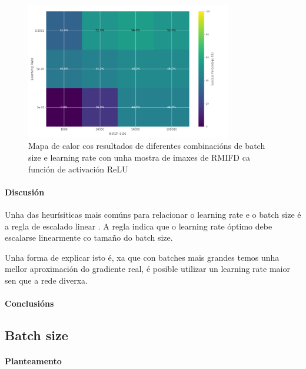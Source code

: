 \begin{figure}[ht]
    \centering
    \includegraphics[width=0.8\textwidth]{imaxes/e_heatmap_MLP_RFMID.png}
    \caption{Mapa de calor cos resultados de diferentes combinacións de batch size e learning rate con unha mostra de imaxes de RMIFD ca función de activación ReLU}
    \label{fig:e_heatmap_MLP_RFMID}
\end{figure}

\paragraph{Discusión}
\label{par:Discusión}

Unha das heurísiticas mais comúns para relacionar o learning rate e o batch size é a regla de escalado linear \cite{goyal2018accuratelargeminibatchsgd}. 
A regla indica que o learning rate óptimo debe escalarse linearmente co tamaño do batch size. 

Unha forma de explicar isto é, xa que con batches mais grandes temos unha mellor aproximación do gradiente real, é posible utilizar un learning rate maior sen que a rede diverxa.


\paragraph{Conclusións}
\label{par:Conclusións}




\subsection{Batch size}
\label{subsec:Batch size}

\paragraph{Planteamento}
\label{par:Planteamento}

